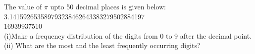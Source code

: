 The value of $\pi$ upto 50 decimal places is given below:
3.141592653589793238462643383279502884197\\
16939937510\\
(i)Make a frequency distribution of the digits from 0 to 9 after the decimal point.\\
(ii) What are the most and the least frequently occurring digits?\\
